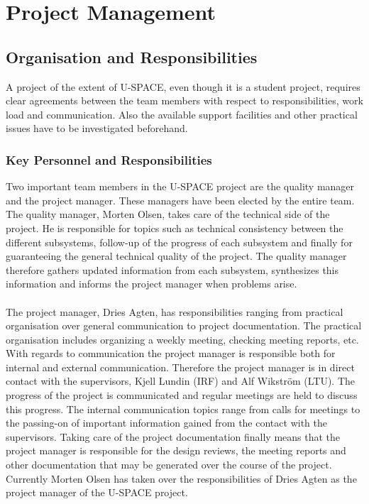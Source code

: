 \chapter{Project Management}
\label{chap:project_management}
%
\section{Organisation and Responsibilities}
%
A project of the extent of \ac{U-SPACE}, even though it is a student project, requires clear agreements between the team members with respect to responsibilities, work load and communication. Also the available support facilities and other practical issues have to be investigated beforehand.
%
\subsection{Key Personnel and Responsibilities}
%
Two important team members in the \ac{U-SPACE} project are the quality manager and the project manager. These managers have been elected by the entire team. The quality manager, Morten Olsen, takes care of the technical side of the project. He is responsible for topics such as technical consistency between the different subsystems, follow-up of the progress of each subsystem and finally for guaranteeing the general technical quality of the project. The quality manager therefore gathers updated information from each subsystem, synthesizes this information and informs the project manager when problems arise.
\\
\\
The project manager, Dries Agten, has responsibilities ranging from practical organisation over general communication to project documentation. The practical organisation includes organizing a weekly meeting, checking meeting reports, etc. With regards to communication the project manager is responsible both for internal and external communication. Therefore the project manager is in direct contact with the supervisors, Kjell Lundin (\ac{IRF}) and Alf Wikström (\ac{LTU}). The progress of the project is communicated and regular meetings are held to discuss this progress.  The internal communication topics range from calls for meetings to the passing-on of important information gained from the contact with the supervisors. Taking care of the project documentation finally means that the project manager is responsible for the design reviews, the meeting reports and other documentation that may be generated over the course of the project. Currently Morten Olsen has taken over the responsibilities of Dries Agten as the project manager of the \ac{U-SPACE} project.
%
